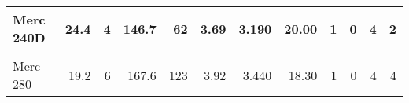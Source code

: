 \documentclass{article}\usepackage[]{graphicx}\usepackage[]{xcolor}
\newenvironment{knitrout}{}{} %
\begin{document}
\begin{knitrout}
\begin{table}
\begin{tabular}[t]{l|r|r|r|r|r|r|r|r|r|r|r}
\hline
Merc 240D & 24.4 & 4 & 146.7 & 62 & 3.69 & 3.190 & 20.00 & 1 & 0 & 4 & 2\\
\hline
\cellcolor{gray!6}{Merc 230} & \cellcolor{gray!6}{22.8} & \cellcolor{gray!6}{4} & \cellcolor{gray!6}{140.8} & \cellcolor{gray!6}{95} & \cellcolor{gray!6}{3.92} & \cellcolor{gray!6}{3.150} & \cellcolor{gray!6}{22.90} & \cellcolor{gray!6}{1} & \cellcolor{gray!6}{0} & \cellcolor{gray!6}{4} & \cellcolor{gray!6}{2}\\
\hline
Merc 280 & 19.2 & 6 & 167.6 & 123 & 3.92 & 3.440 & 18.30 & 1 & 0 & 4 & 4\\
\hline
\end{tabular}
\end{table}

\end{knitrout}

    
\end{document}
